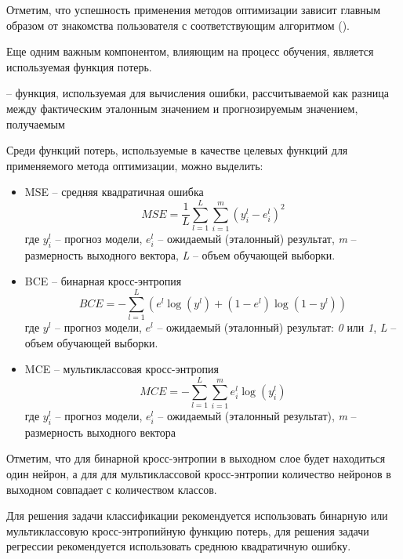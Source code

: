 Отметим, что успешность применения методов оптимизации зависит главным образом от знакомства пользователя с соответствующим алгоритмом ().

Еще одним важным компонентом, влияющим на процесс обучения, является используемая функция потерь.

 -- функция, используемая для вычисления ошибки, рассчитываемой как разница между фактическим эталонным значением и прогнозируемым значением, получаемым 

Среди функций потерь, используемые в качестве целевых функций для применяемого метода оптимизации, можно выделить:

\begin{itemize}
	\item MSE -- средняя квадратичная ошибка\\
		\begin{equation*}
			MSE = \frac{1}{L} \sum_{l=1}^L \sum_{i=1}^m (y_i^l - e_i^l)^2
		\end{equation*}
		где $y_i^l$ -- прогноз модели, $e_i^l$ -- ожидаемый (эталонный) результат, \textit{m} -- размерность выходного вектора, \textit{L} -- объем обучающей выборки.

	\item BCE -- бинарная кросс-энтропия\\
	\begin{equation*}
		BCE = - \sum_{l=1}^L (e^l \log(y^l) + (1 - e^l)\log(1 - y^l))
	\end{equation*}
	где $y^l$ -- прогноз модели, $e^l$ -- ожидаемый (эталонный) результат: \textit{0} или \textit{1}, \textit{L} -- объем обучающей выборки.
	\item MCE -- мультиклассовая кросс-энтропия\\
	\begin{equation*}
		MCE = - \sum_{l=1}^L \sum_{i=1}^m e_{i}^l \log(y_{i}^l)
	\end{equation*}
	где $y_{i}^l$ -- прогноз модели, $e_i^l$ -- ожидаемый (эталонный результат), \textit{m} -- размерность выходного вектора
\end{itemize}

Отметим, что для бинарной кросс-энтропии в выходном слое  будет находиться один нейрон, а для для мультиклассовой кросс-энтропии количество нейронов в выходном  совпадает с количеством классов.

Для решения задачи классификации рекомендуется использовать бинарную или мультиклассовую кросс-энтропийную функцию потерь, для решения задачи регрессии рекомендуется использовать среднюю квадратичную ошибку.


